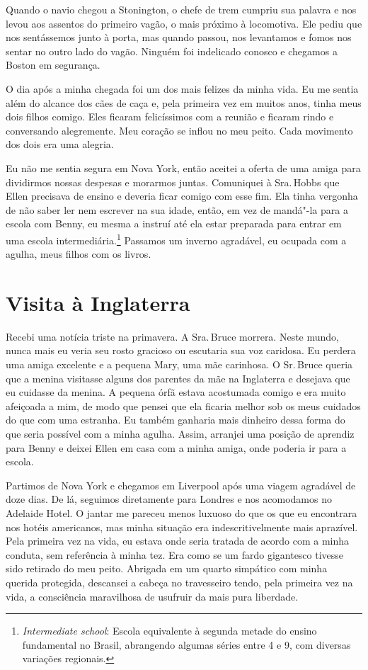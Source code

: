 Quando o navio chegou a Stonington, o
chefe de trem cumpriu sua palavra e nos levou aos assentos do primeiro
vagão, o mais próximo à locomotiva. Ele pediu que nos sentássemos junto
à porta, mas quando passou, nos levantamos e fomos nos sentar no outro
lado do vagão. Ninguém foi indelicado conosco e chegamos a Boston em
segurança.

O dia após a minha chegada foi um dos
mais felizes da minha vida. Eu me sentia além do alcance dos cães de
caça e, pela primeira vez em muitos anos, tinha meus dois filhos comigo.
Eles ficaram felicíssimos com a reunião e ficaram rindo e conversando
alegremente. Meu coração se inflou no meu peito. Cada movimento dos dois
era uma alegria.

Eu não me sentia segura em Nova York,
então aceitei a oferta de uma amiga para dividirmos nossas despesas e
morarmos juntas. Comuniquei à Sra.\,Hobbs que Ellen precisava de ensino e
deveria ficar comigo com esse fim. Ela tinha vergonha de não saber ler
nem escrever na sua idade, então, em vez de mandá"-la para a escola com
Benny, eu mesma a instruí até ela estar preparada para entrar em uma
escola intermediária.\footnote{\emph{Intermediate school}: Escola
  equivalente à segunda metade do ensino fundamental no Brasil,
  abrangendo algumas séries entre 4 e 9, com diversas variações
  regionais.} Passamos um inverno agradável, eu ocupada com a agulha,
meus filhos com os livros.

\chapter*{Visita à Inglaterra}

Recebi uma notícia triste na primavera.
A Sra.\,Bruce morrera. Neste mundo, nunca mais eu veria seu rosto
gracioso ou escutaria sua voz caridosa. Eu perdera uma amiga excelente e
a pequena Mary, uma mãe carinhosa. O Sr.\,Bruce queria que a menina
visitasse alguns dos parentes da mãe na Inglaterra e desejava que eu
cuidasse da menina. A pequena órfã estava acostumada comigo e era muito
afeiçoada a mim, de modo que pensei que ela ficaria melhor sob os meus
cuidados do que com uma estranha. Eu também ganharia mais dinheiro dessa
forma do que seria possível com a minha agulha. Assim, arranjei uma
posição de aprendiz para Benny e deixei Ellen em casa com a minha amiga,
onde poderia ir para a escola.

Partimos de Nova York e chegamos em
Liverpool após uma viagem agradável de doze dias. De lá, seguimos
diretamente para Londres e nos acomodamos no Adelaide Hotel. O jantar me
pareceu menos luxuoso do que os que eu encontrara nos hotéis americanos,
mas minha situação era indescritivelmente mais aprazível. Pela primeira
vez na vida, eu estava onde seria tratada de acordo com a minha conduta,
sem referência à minha tez. Era como se um fardo gigantesco tivesse sido
retirado do meu peito. Abrigada em um quarto simpático com minha querida
protegida, descansei a cabeça no travesseiro tendo, pela primeira vez na
vida, a consciência maravilhosa de usufruir da mais pura liberdade.

